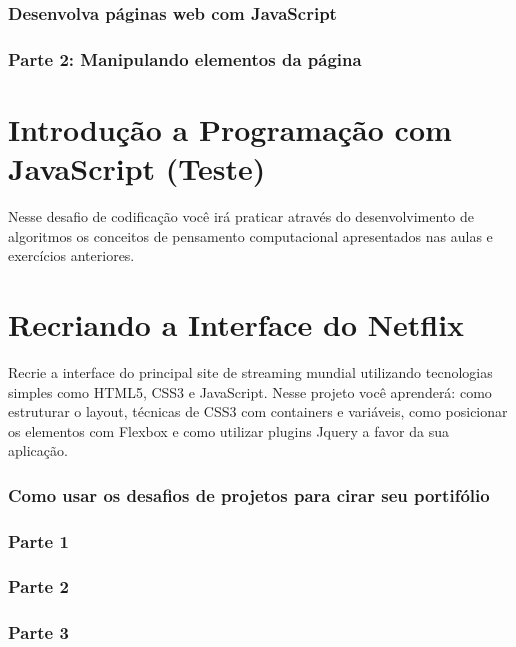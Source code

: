 \documentclass[12pt,a4paper]{article}
\begin{document}
	\subsubsection{Desenvolva páginas web com JavaScript}
	
	\subsubsection{Parte 2: Manipulando elementos da página}
	
	
	
	\section{Introdução a Programação com JavaScript (Teste)}
	
	Nesse desafio de codificação você irá praticar através do desenvolvimento de algoritmos os conceitos de pensamento computacional apresentados nas aulas e exercícios anteriores.
	
	\section{Recriando a Interface do Netflix}
	
	Recrie a interface do principal site de streaming mundial utilizando tecnologias simples como HTML5, CSS3 e JavaScript. Nesse projeto você aprenderá: como estruturar o layout, técnicas de CSS3 com containers e variáveis, como posicionar os elementos com Flexbox e como utilizar plugins Jquery a favor da sua aplicação.
	
	\subsubsection{Como usar os desafios de projetos para cirar seu portifólio}
	
	\subsubsection{Parte 1}
	
	\subsubsection{Parte 2}
	
	\subsubsection{Parte 3}
	
\end{document}
